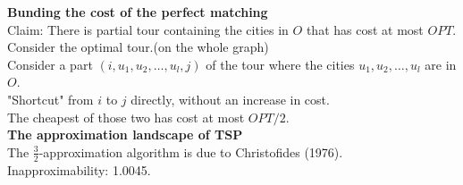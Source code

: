 \documentclass[onecolumn]{report}
\begin{document}
\textbf{Bunding the cost of the perfect matching}\\
\indent Claim: There is partial tour containing the cities in $O$ that has cost at most $OPT$.\\
\indent \indent Consider the optimal tour.(on the whole graph)\\
\indent \indent Consider a part $(i,u_1,u_2,\dots,u_l,j)$ of the tour where the cities $u_1,u_2,\dots,u_l$ are in $O$.\\
\indent \indent "Shortcut" from $i$ to $j$ directly, without an increase in cost.\\
\indent The cheapest of those two has cost at most $OPT/2$.\\
\textbf{The approximation landscape of TSP}\\
\indent The $\frac{3}{2}$-approximation algorithm is due to Christofides (1976).\\
\indent Inapproximability: 1.0045.\\
\end{document}
